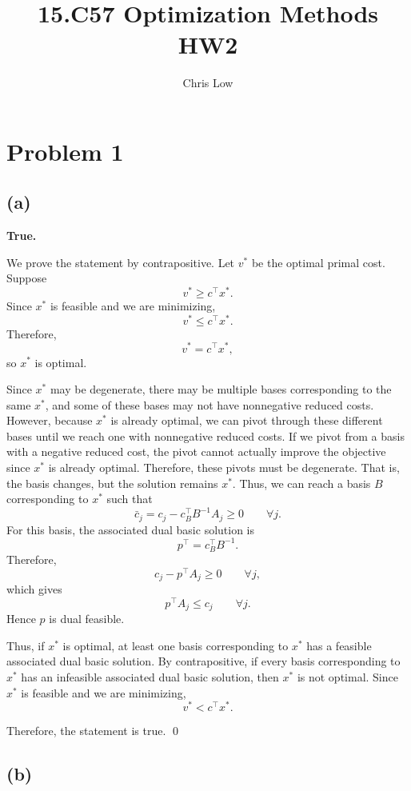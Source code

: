 \documentclass{article}
\title{15.C57 Optimization Methods HW2}
\author{Chris Low}
\date{} %
\begin{document}
\maketitle

\section*{Problem 1}

\subsection*{(a)}

\textbf{True.}

We prove the statement by contrapositive. Let $v^*$ be the optimal primal
cost. Suppose
\[
v^* \geq c^\top x^*.
\]
Since $x^*$ is feasible and we are minimizing,
\[
v^* \leq c^\top x^*.
\]
Therefore,
\[
v^*=c^\top x^*,
\]
so $x^*$ is optimal.

Since $x^*$ may be degenerate, there may be multiple bases corresponding
to the same $x^*$, and some of these bases may not have nonnegative
reduced costs. However, because $x^*$ is already optimal, we can pivot
through these different bases until we reach one with nonnegative reduced
costs. If we pivot from a basis with a negative reduced cost, the pivot
cannot actually improve the objective since $x^*$ is already optimal.
Therefore, these pivots must be degenerate. That is, the basis changes, but the
solution remains $x^*$. Thus, we can reach a basis $B$ corresponding to
$x^*$ such that
\[
\bar c_j
=
c_j-c_B^\top B^{-1}A_j
\geq 0
\qquad \forall j.
\]
For this basis, the associated dual basic solution is
\[
p^\top=c_B^\top B^{-1}.
\]
Therefore,
\[
c_j-p^\top A_j\geq0
\qquad \forall j,
\]
which gives
\[
p^\top A_j\leq c_j
\qquad \forall j.
\]
Hence $p$ is dual feasible.

Thus, if $x^*$ is optimal, at least one basis corresponding to $x^*$
has a feasible associated dual basic solution. By contrapositive, if
every basis corresponding to $x^*$ has an infeasible associated dual
basic solution, then $x^*$ is not optimal. Since $x^*$ is feasible and
we are minimizing,
\[
v^*<c^\top x^*.
\]

Therefore, the statement is true. \qed


\newpage


\subsection*{(b)}
\end{document}
